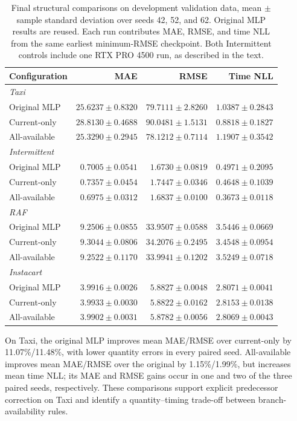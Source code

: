 \documentclass[runningheads]{llncs}
\begin{document}
\begin{table}[t]
\caption{Final structural comparisons on development validation data,
mean $\pm$ sample standard deviation over seeds 42, 52, and 62. Original MLP
results are reused. Each run contributes MAE, RMSE, and time NLL from the
same earliest minimum-RMSE checkpoint. Both Intermittent controls include
one RTX PRO 4500 run, as described in the text.}
\label{tab:extension}\centering\small
\begin{tabular}{lrrr}
\toprule
Configuration & MAE & RMSE & Time NLL\\
\midrule
\multicolumn{4}{l}{\textit{Taxi}}\\
Original MLP & $25.6237\pm0.8320$ & $79.7111\pm2.8260$ & $1.0387\pm0.2843$\\
Current-only & $28.8130\pm0.4688$ & $90.0481\pm1.5131$ & $0.8818\pm0.1827$\\
All-available & $25.3290\pm0.2945$ & $78.1212\pm0.7114$ & $1.1907\pm0.3542$\\
\midrule
\multicolumn{4}{l}{\textit{Intermittent}}\\
Original MLP & $0.7005\pm0.0541$ & $1.6730\pm0.0819$ & $0.4971\pm0.2095$\\
Current-only & $0.7357\pm0.0454$ & $1.7447\pm0.0346$ & $0.4648\pm0.1039$\\
All-available & $0.6975\pm0.0312$ & $1.6837\pm0.0100$ & $0.3673\pm0.0118$\\
\midrule
\multicolumn{4}{l}{\textit{RAF}}\\
Original MLP & $9.2506\pm0.0855$ & $33.9507\pm0.0588$ & $3.5446\pm0.0669$\\
Current-only & $9.3044\pm0.0806$ & $34.2076\pm0.2495$ & $3.4548\pm0.0954$\\
All-available & $9.2522\pm0.1170$ & $33.9941\pm0.1202$ & $3.5249\pm0.0718$\\
\midrule
\multicolumn{4}{l}{\textit{Instacart}}\\
Original MLP & $3.9916\pm0.0026$ & $5.8827\pm0.0048$ & $2.8071\pm0.0041$\\
Current-only & $3.9933\pm0.0030$ & $5.8822\pm0.0162$ & $2.8153\pm0.0138$\\
All-available & $3.9902\pm0.0031$ & $5.8782\pm0.0056$ & $2.8069\pm0.0043$\\
\bottomrule
\end{tabular}
\end{table}

On Taxi, the original MLP improves mean MAE/RMSE over current-only by
11.07\%/11.48\%, with lower quantity errors in every paired seed.
All-available improves mean MAE/RMSE over the original by 1.15\%/1.99\%,
but increases mean time NLL; its MAE and RMSE gains occur in one and two
of the three paired seeds, respectively. These comparisons support
explicit predecessor correction on Taxi and identify a quantity--timing
trade-off between branch-availability rules.
\end{document}
